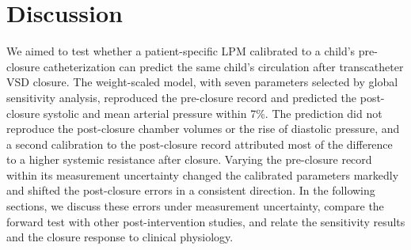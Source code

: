 \FloatBarrier
\section{Discussion}
\label{sec:discussion}
We aimed to test whether a patient-specific LPM calibrated to a child's pre-closure catheterization can predict the same child's circulation after transcatheter VSD closure. The weight-scaled model, with seven parameters selected by global sensitivity analysis, reproduced the pre-closure record and predicted the post-closure systolic and mean arterial pressure within 7\%. The prediction did not reproduce the post-closure chamber volumes or the rise of diastolic pressure, and a second calibration to the post-closure record attributed most of the difference to a higher systemic resistance after closure. Varying the pre-closure record within its measurement uncertainty changed the calibrated parameters markedly and shifted the post-closure errors in a consistent direction. In the following sections, we discuss these errors under measurement uncertainty, compare the forward test with other post-intervention studies, and relate the sensitivity results and the closure response to clinical physiology.


